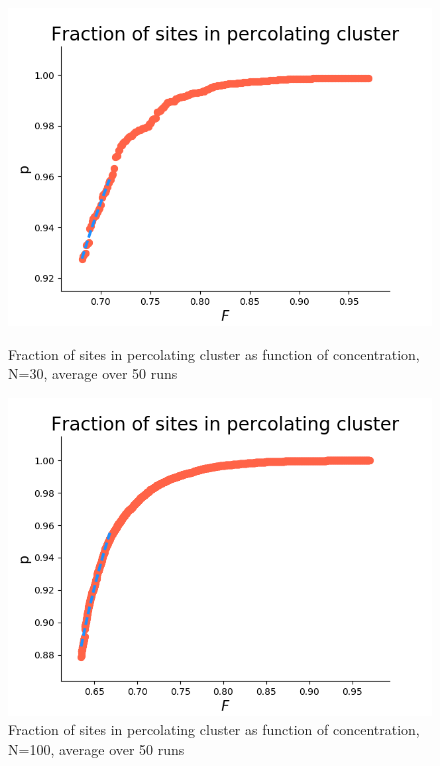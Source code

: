 \documentclass[12pt]{article}
\begin{document}
\begin{figure}[!htb]
  \includegraphics[width=\linewidth]{fractionFwithFit10percN30runs50.png}
  \caption{Fraction of sites in percolating cluster as function of concentration, N=30, average over 50 runs}\label{fig:fraction30}
\endminipage\hfill
{}
  \includegraphics[width=\linewidth]{fractionFwithFit10percN100.png}
  \caption{Fraction of sites in percolating cluster as function of concentration, N=100, average over 50 runs}\label{fig:fraction100}
\endminipage\hfill

\end{figure}
\end{document}
